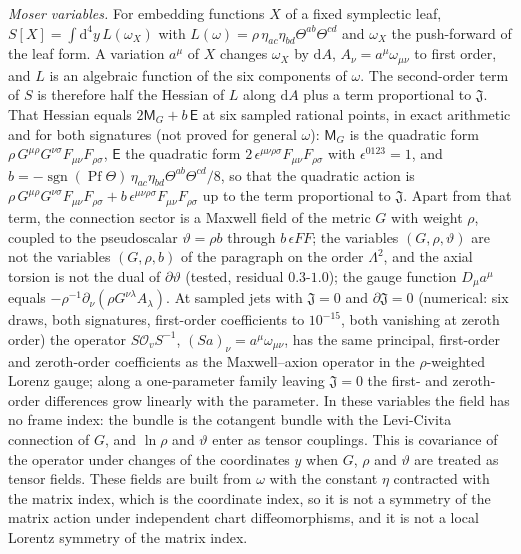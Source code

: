 \emph{Moser variables.} For embedding functions \(X\) of a fixed symplectic leaf, \(S[X]=\int\mathrm d^4y\,L(\omega_X)\) with \(L(\omega)=\rho\,\eta_{ac}\eta_{bd}\Theta^{ab}\Theta^{cd}\) and \(\omega_X\) the push-forward of the leaf form. A variation \(a^\mu\) of \(X\) changes \(\omega_X\) by \(\mathrm dA\), \(A_\nu=a^\mu\omega_{\mu\nu}\) to first order, and \(L\) is an algebraic function of the six components of \(\omega\). The second-order term of \(S\) is therefore half the Hessian of \(L\) along \(\mathrm dA\) plus a term proportional to \(\mathfrak J\). That Hessian equals \(2\mathsf M_G+b\,\mathsf E\) at six sampled rational points, in exact arithmetic and for both signatures (not proved for general \(\omega\)): \(\mathsf M_G\) is the quadratic form \(\rho\,G^{\mu\rho}G^{\nu\sigma}F_{\mu\nu}F_{\rho\sigma}\), \(\mathsf E\) the quadratic form \(2\,\epsilon^{\mu\nu\rho\sigma}F_{\mu\nu}F_{\rho\sigma}\) with \(\epsilon^{0123}=1\), and \(b=-\operatorname{sgn}(\operatorname{Pf}\Theta)\,\eta_{ac}\eta_{bd}\Theta^{ab}\Theta^{cd}/8\), so that the quadratic action is \(\rho\,G^{\mu\rho}G^{\nu\sigma}F_{\mu\nu}F_{\rho\sigma}+b\,\epsilon^{\mu\nu\rho\sigma}F_{\mu\nu}F_{\rho\sigma}\) up to the term proportional to \(\mathfrak J\). Apart from that term, the connection sector is a Maxwell field of the metric \(G\) with weight \(\rho\), coupled to the pseudoscalar \(\vartheta=\rho b\) through \(b\,\epsilon FF\); the variables \((G,\rho,\vartheta)\) are not the variables \((G,\rho,b)\) of the paragraph on the order \(\Lambda^2\), and the axial torsion is not the dual of \(\partial\vartheta\) (tested, residual \(0.3\)-\(1.0\)); the gauge function \(D_\mu a^\mu\) equals \(-\rho^{-1}\partial_\nu(\rho G^{\nu\lambda}A_\lambda)\). At sampled jets with \(\mathfrak J=0\) and \(\partial\mathfrak J=0\) (numerical: six draws, both signatures, first-order coefficients to \(10^{-15}\), both vanishing at zeroth order) the operator \(S\mathcal O_vS^{-1}\), \((Sa)_\nu=a^\mu\omega_{\mu\nu}\), has the same principal, first-order and zeroth-order coefficients as the Maxwell--axion operator in the \(\rho\)-weighted Lorenz gauge; along a one-parameter family leaving \(\mathfrak J=0\) the first- and zeroth-order differences grow linearly with the parameter. In these variables the field has no frame index: the bundle is the cotangent bundle with the Levi-Civita connection of \(G\), and \(\ln\rho\) and \(\vartheta\) enter as tensor couplings. This is covariance of the operator under changes of the coordinates \(y\) when \(G\), \(\rho\) and \(\vartheta\) are treated as tensor fields. These fields are built from \(\omega\) with the constant \(\eta\) contracted with the matrix index, which is the coordinate index, so it is not a symmetry of the matrix action under independent chart diffeomorphisms, and it is not a local Lorentz symmetry of the matrix index.

